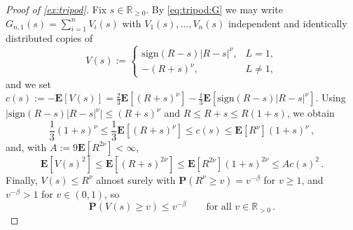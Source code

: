 \documentclass{article}
\newcommand{\R}{\mathbb{R}}
\newcommand{\Rp}{\R_{\geq0}}
\newcommand{\Rpp}{\R_{>0}}
\newcommand{\lab}{\left[} %
\newcommand{\rab}{\right]} %
\newcommand{\ab}[1]{\lab #1 \rab} %
\newcommand{\abOf}[1]{\!\ab{#1}} %
\newcommand{\lb}{\left(} %
\newcommand{\rb}{\right)} %
\newcommand{\br}[1]{\lb #1 \rb} %
\newcommand{\brOf}[1]{\!\br{#1}} %
\newcommand{\absof}[1]{\vert #1 \vert} %
\renewcommand{\Pr}{\mathbf{P}} %
\newcommand{\PrOf}[1]{\Pr\brOf{#1}}
\newcommand{\E}{\mathbf{E}} %
\newcommand{\Eof}[1]{\E[#1]}
\newcommand{\EOf}[1]{\E\abOf{#1}}
\newcommand{\eqcm}{\,,} %
\newcommand{\eqfs}{\,.}
\newcommand{\sign}{\mathrm{sign}}
\begin{document}
\begin{proof}[Proof of \cref{ex:tripod}]
    Fix $s\in\Rp$. By \eqref{eq:tripod:G} we may write $G_{n,1}(s) = \sum_{i=1}^n V_i(s)$ with $V_1(s),\dots,V_n(s)$ independent and identically distributed copies of
    \begin{equation}
        V(s) :=
        \begin{cases}
            \sign(R-s)\absof{R-s}^\nu, & L = 1,\\
            -\br{R+s}^\nu, & L\neq1,
        \end{cases}
    \end{equation}
    and we set $c(s) := -\Eof{V(s)} = \frac23\Eof{\br{R+s}^\nu} - \frac13\EOf{\sign(R-s)\absof{R-s}^\nu}$. Using $\absof{\sign(R-s)\absof{R-s}^\nu}\leq (R+s)^\nu$ and $R\leq R+s\leq R(1+s)$, we obtain
    \begin{equation}\label{eq:tripod:c}
        \frac13\br{1+s}^\nu
        \leq
        \frac13\EOf{\br{R+s}^\nu}
        \leq
        c(s)
        \leq
        \Eof{R^\nu}\br{1+s}^\nu
        \eqcm
    \end{equation}
    and, with $A := 9\Eof{R^{2\nu}}<\infty$,
    \begin{equation}\label{eq:tripod:var}
        \EOf{V(s)^2}
        \leq
        \EOf{\br{R+s}^{2\nu}}
        \leq
        \Eof{R^{2\nu}}\br{1+s}^{2\nu}
        \leq
        A c(s)^2
        \eqfs
    \end{equation}
    Finally, $V(s)\leq R^\nu$ almost surely with $\PrOf{R^\nu\geq v} = v^{-\beta}$ for $v\geq1$, and $v^{-\beta}>1$ for $v\in(0,1)$, so
    \begin{equation}\label{eq:tripod:Vtail}
        \PrOf{V(s)\geq v} \leq v^{-\beta}
        \qquad\text{for all } v\in\Rpp
        \eqfs
    \end{equation}
    

\end{proof}
\end{document}
